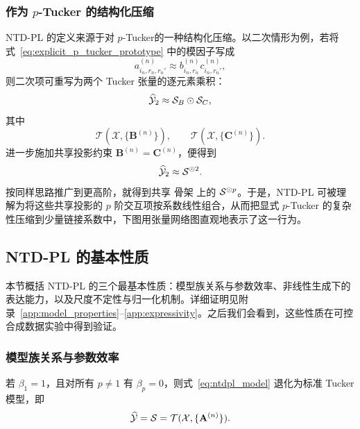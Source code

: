 \subsubsection{作为 $p$-Tucker 的结构化压缩}

NTD-PL 的定义来源于对 $p$-Tucker的一种结构化压缩。以二次情形为例，若将式~\eqref{eq:explicit_p_tucker_prototype} 中的模因子写成
\begin{equation}
 a^{(n)}_{i_n,r_n,r_n'} \approx b^{(n)}_{i_n,r_n}c^{(n)}_{i_n,r_n'},
\end{equation}
则二次项可重写为两个 Tucker 张量的逐元素乘积：
\begin{equation}
\label{eq:separable_quadratic_factorization}
\widehat{\mathcal{Y}}_2 \approx \mathcal{S}_B \odot \mathcal{S}_C,
\end{equation}
其中
\begin{equation}
\mathcal{T}(\mathcal{X},\{\mathbf{B}^{(n)}\}),
\qquad
\mathcal{T}(\mathcal{X},\{\mathbf{C}^{(n)}\}).
\end{equation}
进一步施加共享投影约束 $\mathbf B^{(n)}=\mathbf C^{(n)}$，便得到
\begin{equation}
\label{eq:shared_quadratic_term}
\widehat{\mathcal{Y}}_2 \approx \mathcal{S}^{\odot 2}.
\end{equation}
按同样思路推广到更高阶，就得到共享 骨架 上的 $\mathcal{S}^{\odot p}$。于是，NTD-PL 可被理解为将这些共享投影的 $p$ 阶交互项按系数线性组合，从而把显式 $p$-Tucker 的复杂性压缩到少量链接系数中，下图用张量网络图直观地表示了这一行为。
\begin{center}
\resizebox{\linewidth}{!}{}
\end{center}

\subsection{NTD-PL 的基本性质}

本节概括 NTD-PL 的三个最基本性质：模型族关系与参数效率、非线性生成下的表达能力，以及尺度不定性与归一化机制。详细证明见附录~\ref{app:model_properties}--\ref{app:expressivity}。之后我们会看到，这些性质在可控合成数据实验中得到验证。

\subsubsection{模型族关系与参数效率}

\begin{proposition}
\label{prop:tucker_special_case}
若 $\beta_1=1$，且对所有 $p\neq 1$ 有 $\beta_p=0$，则式~\eqref{eq:ntdpl_model} 退化为标准 Tucker 模型，即
\begin{equation}
\widehat{\mathcal{Y}}
=
\mathcal{S}
=
\mathcal{T}(\mathcal{X},\{\mathbf{A}^{(n)}\}).
\end{equation}
\end{proposition}

